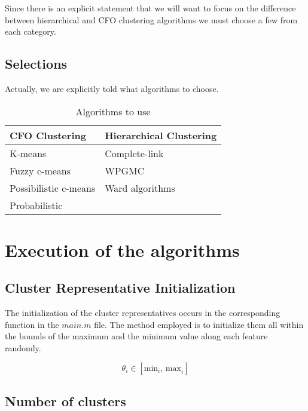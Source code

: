 \documentclass[12pt, a4paper]{article}
\begin{document}
Since there is an explicit statement that we will want to focus on the difference between hierarchical and CFO clustering algorithms we must choose a few from each category.
\newline

\subsection{Selections}

Actually, we are explicitly told what algorithms to choose.

\begin{table}[H]
    \caption{Algorithms to use}\label{tab:choices}
    \begin{center}
        \begin{tabular}{l|l}
            \hline
            \textbf{CFO Clustering} & \textbf{Hierarchical Clustering} \\
            \hline
            K-means & Complete-link \\
            Fuzzy c-means & WPGMC \\
            Possibilistic c-means & Ward algorithms \\
            Probabilistic \\
            \hline
        \end{tabular}
    \end{center}
\end{table}

\section{Execution of the algorithms}

\subsection{Cluster Representative Initialization}

The initialization of the cluster representatives occurs in the corresponding function in the $main.m$ file. The method employed is to initialize them all within the bounds of the maximum and the minimum value along each feature randomly.

\[\theta_i \in \left[\text{min}_i \text{, max}_i\right]\]

\subsection{Number of clusters}
\end{document}
